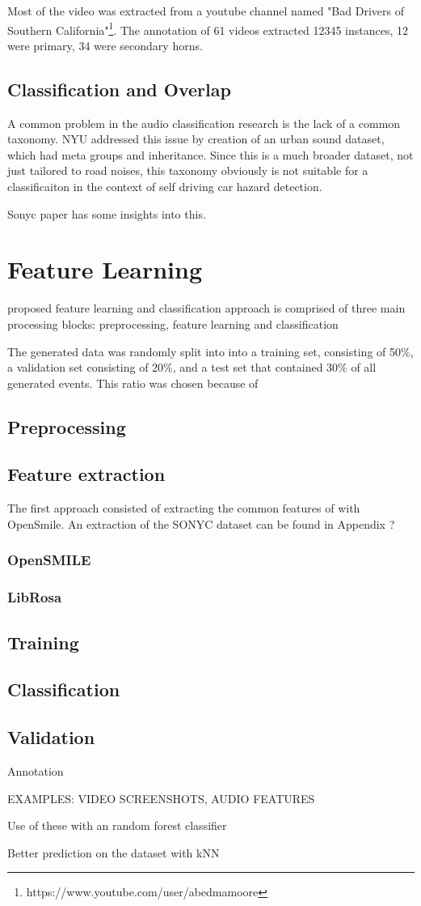 Most of the video was extracted from a youtube channel named "Bad Drivers of Southern California"\footnote{https://www.youtube.com/user/abedmamoore}. 
The annotation of 61 videos extracted 12345 instances, 12 were primary, 34 were secondary horns. 

\subsection{Classification and Overlap}
A common problem in the audio classification research is the lack of a common taxonomy. NYU addressed this issue by creation of an urban sound dataset, which had meta groups and inheritance. Since this is a much broader dataset, not just tailored to road noises, this taxonomy obviously is not suitable for a classificaiton in the context of self driving car hazard detection.


Sonyc paper has some insights into this.

\section{Feature Learning}
proposed feature learning and classification approach is comprised
of three main processing blocks: preprocessing, feature learning
and classification

The generated data was randomly split into into a training set, consisting of 50\%, a validation set consisting of 20\%, and a test set that contained 30\% of all generated events.
This ratio was chosen because of %

\subsection{Preprocessing}
\subsection{Feature extraction}
The first approach consisted of extracting the common features of %
with OpenSmile. An extraction of the SONYC dataset can be found in Appendix ?
\subsubsection{OpenSMILE}
\subsubsection{LibRosa}
\subsection{Training}
\subsection{Classification}
\subsection{Validation}

Annotation

EXAMPLES: VIDEO SCREENSHOTS, AUDIO FEATURES

Use of these with an random forest classifier 


Better prediction on the dataset with kNN